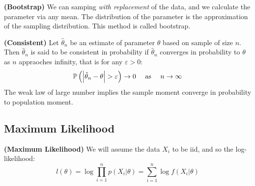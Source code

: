 \begin{definition}{\textbf{(Bootstrap)}}
    We can samping \emph{with replacement} of the data, and we calculate the parameter via any mean. The distribution of the parameter is the approximation of the sampling distribution. This method is called bootstrap.
\end{definition}

\begin{definition}{\textbf{(Consistent)}}
    Let $\hat{\theta}_n$ be an estimate of parameter $\theta$ based on sample of size $n$. Then $\hat{\theta}_n$ is said to be consistent in probability if $\hat{\theta}_n$ converges in probability to $\theta$ as $n$ appraoches infinity, that is for any $\varepsilon>0$:
    \begin{equation*}
        \mathbb{P}\left( \left| \hat{\theta}_n - \theta \right| > \varepsilon \right)\rightarrow0 \quad \text{ as } \quad n \rightarrow\infty
    \end{equation*}
    The weak law of large number implies the sample moment converge in probability to population moment. 
\end{definition}

\subsection{Maximum Likelihood}

\begin{definition}{\textbf{(Maximum Likelihood)}}
    We will assume the data $X_i$ to be iid, and so the log-likelihood:
    \begin{equation*}
        l(\theta) = \log \prod^n_{i=1}p(X_i|\theta) = \sum^n_{i=1}\log f(X_i | \theta)
    \end{equation*}
\end{definition}


